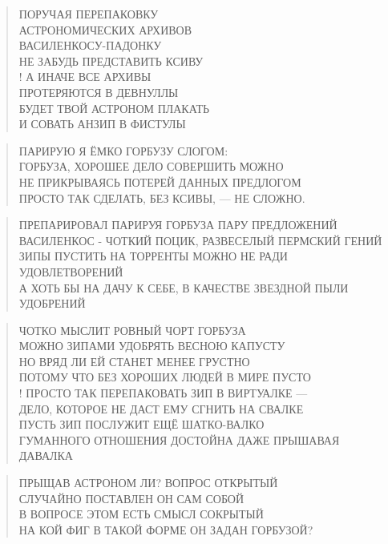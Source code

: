 \poemtitle{***}
\begin{verse}
ПОРУЧАЯ ПЕРЕПАКОВКУ\\
АСТРОНОМИЧЕСКИХ АРХИВОВ\\
ВАСИЛЕНКОСУ-ПАДОНКУ\\
НЕ ЗАБУДЬ ПРЕДСТАВИТЬ КСИВУ\\!
А ИНАЧЕ ВСЕ АРХИВЫ\\
ПРОТЕРЯЮТСЯ В ДЕВНУЛЛЫ\\
БУДЕТ ТВОЙ АСТРОНОМ ПЛАКАТЬ\\
И СОВАТЬ АНЗИП В ФИСТУЛЫ
\end{verse}

\poemtitle{***}
\begin{verse}
ПАРИРУЮ Я ЁМКО ГОРБУЗУ СЛОГОМ:\\
ГОРБУЗА, ХОРОШЕЕ ДЕЛО СОВЕРШИТЬ МОЖНО\\
НЕ ПРИКРЫВАЯСЬ ПОТЕРЕЙ ДАННЫХ ПРЕДЛОГОМ\\
ПРОСТО ТАК СДЕЛАТЬ, БЕЗ КСИВЫ, — НЕ СЛОЖНО.
\end{verse}

\poemtitle{***}
\begin{verse}
ПРЕПАРИРОВАЛ ПАРИРУЯ ГОРБУЗА ПАРУ ПРЕДЛОЖЕНИЙ\\
ВАСИЛЕНКОС - ЧОТКИЙ ПОЦИК, РАЗВЕСЕЛЫЙ ПЕРМСКИЙ ГЕНИЙ\\
ЗИПЫ ПУСТИТЬ НА ТОРРЕНТЫ МОЖНО НЕ РАДИ УДОВЛЕТВОРЕНИЙ\\
А ХОТЬ БЫ НА ДАЧУ К СЕБЕ, В КАЧЕСТВЕ ЗВЕЗДНОЙ ПЫЛИ УДОБРЕНИЙ
\end{verse}

\poemtitle{***}
\begin{verse}
ЧОТКО МЫСЛИТ РОВНЫЙ ЧОРТ ГОРБУЗА\\
МОЖНО ЗИПАМИ УДОБРЯТЬ ВЕСНОЮ КАПУСТУ\\
НО ВРЯД ЛИ ЕЙ СТАНЕТ МЕНЕЕ ГРУСТНО\\
ПОТОМУ ЧТО БЕЗ ХОРОШИХ ЛЮДЕЙ В МИРЕ ПУСТО\\!
ПРОСТО ТАК ПЕРЕПАКОВАТЬ ЗИП В ВИРТУАЛКЕ —\\
ДЕЛО, КОТОРОЕ НЕ ДАСТ ЕМУ СГНИТЬ НА СВАЛКЕ\\
ПУСТЬ ЗИП ПОСЛУЖИТ ЕЩЁ ШАТКО-ВАЛКО\\
ГУМАННОГО ОТНОШЕНИЯ ДОСТОЙНА ДАЖЕ ПРЫШАВАЯ ДАВАЛКА
\end{verse}

\poemtitle{***}
\begin{verse}
ПРЫЩАВ АСТРОНОМ ЛИ? ВОПРОС ОТКРЫТЫЙ\\
СЛУЧАЙНО ПОСТАВЛЕН ОН САМ СОБОЙ\\
В ВОПРОСЕ ЭТОМ ЕСТЬ СМЫСЛ СОКРЫТЫЙ\\
НА КОЙ ФИГ В ТАКОЙ ФОРМЕ ОН ЗАДАН ГОРБУЗОЙ?
\end{verse}

